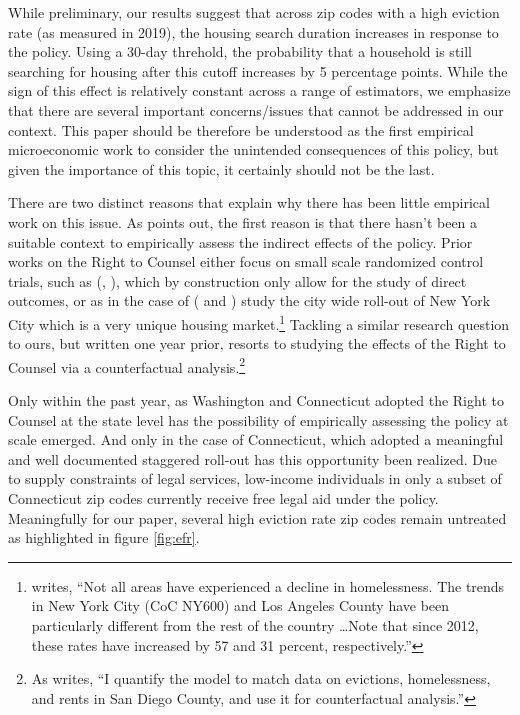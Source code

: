 \documentclass[a4paper,12pt]{article}
\begin{document}
While preliminary, our results suggest that across zip codes with a high eviction rate (as measured in 2019), the housing search duration increases in response to the policy. Using a 30-day threhold, the probability that a household is still searching for housing after this cutoff increases by 5 percentage points. While the sign of this effect is relatively constant across a range of estimators, we emphasize that there are several important concerns/issues that cannot be addressed in our context. This paper should be therefore be understood as the first empirical microeconomic work to consider the unintended consequences of this policy, but given the importance of this topic, it certainly should not be the last.

There are two distinct reasons that explain why there has been little empirical work on this issue. As \cite{abramson2021welfare} points out, the first reason is that there hasn't been a suitable context to empirically assess the indirect effects of the policy. Prior works on the Right to Counsel either focus on small scale randomized control trials, such as (\cite{greiner2012limits}, \cite{seron2001impact}), which by construction only allow for the study of direct outcomes, or as in the case of (\cite{cassidy2022effects} and \cite{ellen2021lawyers}) study the city wide roll-out of New York City which is a very unique housing market.\footnote{\cite{evans2019reducing} writes, ``Not all areas have experienced a decline in homelessness. The trends in New York City (CoC NY600) and Los Angeles County have been particularly different from the rest of the country \dots Note that since 2012, these rates have increased by 57 and 31 percent, respectively.''} Tackling a similar research question to ours, but written one year prior,  \cite{abramson2021welfare} resorts to studying the effects of the Right to Counsel via a counterfactual analysis.\footnote{As \cite{abramson2021welfare} writes, ``I quantify the model to match data on evictions, homelessness, and rents in San Diego
County, and use it for counterfactual analysis.''}\par Only within the past year, as Washington and Connecticut adopted the Right to Counsel at the state level has the possibility of empirically assessing the policy at scale emerged. And only in the case of Connecticut, which adopted a meaningful and well documented staggered roll-out has this opportunity been realized. Due to supply constraints of legal services, low-income individuals in only a subset of Connecticut zip codes currently receive free legal aid under the policy. Meaningfully for our paper, several high eviction rate zip codes remain untreated as highlighted in figure \ref{fig:efr}.\par 
\end{document}
